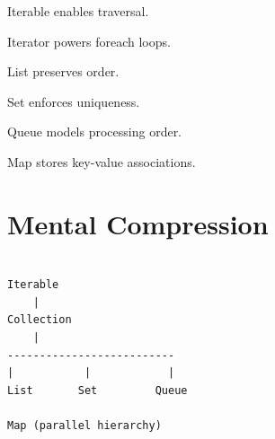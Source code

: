 \documentclass[11pt,a4paper]{book}
\begin{document}

\begin{rosettarule}

Iterable enables traversal.

\end{rosettarule}


\begin{rosettarule}

Iterator powers foreach loops.

\end{rosettarule}


\begin{rosettarule}

List preserves order.

\end{rosettarule}


\begin{rosettarule}

Set enforces uniqueness.

\end{rosettarule}


\begin{rosettarule}

Queue models processing order.

\end{rosettarule}


\begin{rosettarule}

Map stores key-value associations.

\end{rosettarule}


\section{Mental Compression}

\begin{verbatim}

Iterable
    |
Collection
    |
--------------------------
|           |            |
List       Set         Queue

Map (parallel hierarchy)

\end{verbatim}
\end{document}
